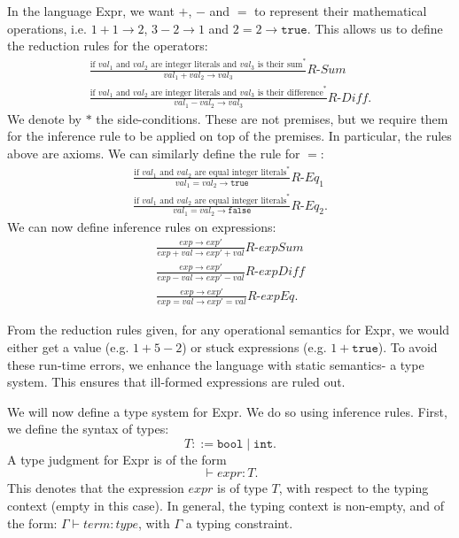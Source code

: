 \documentclass[a4paper, openany]{memoir}
\begin{document}
    In the language Expr, we want $+$, $-$ and $=$ to represent their mathematical operations, i.e. $1 + 1 \to 2$, $3 - 2 \to 1$ and $2 = 2 \to \texttt{true}$. This allows us to define the reduction rules for the operators:
    \begin{align*}
        \frac{\textrm{if } val_1 \textrm{ and } val_2 \textrm{ are integer literals and } val_3 \textrm{ is their sum}^*}{val_1 + val_2 \to val_3} \textit{R-Sum} \\
        \frac{\textrm{if } val_1 \textrm{ and } val_2 \textrm{ are integer literals and } val_3 \textrm{ is their difference}^*}{val_1 - val_2 \to val_3} \textit{R-Diff}.
    \end{align*}
    We denote by $*$ the side-conditions. These are not premises, but we require them for the inference rule to be applied on top of the premises. In particular, the rules above are axioms. We can similarly define the rule for $=$:
    \begin{align*}
        \frac{\textrm{if } val_1 \textrm{ and } val_2 \textrm{ are equal integer literals}^*}{val_1 = val_2 \to \texttt{true}} \textit{R-Eq}_1 \\
        \frac{\textrm{if } val_1 \textrm{ and } val_2 \textrm{ are equal integer literals}^*}{val_1 = val_2 \to \texttt{false}} \textit{R-Eq}_2.
    \end{align*}
    We can now define inference rules on expressions:
    \begin{align*}
        \frac{exp \to exp'}{exp + val \to exp' + val} \textit{R-expSum} \\
        \frac{exp \to exp'}{exp - val \to exp' - val} \textit{R-expDiff} \\
        \frac{exp \to exp'}{exp = val \to exp' = val} \textit{R-expEq}.
    \end{align*}

    From the reduction rules given, for any operational semantics for Expr, we would either get a value (e.g. $1 + 5 - 2$) or stuck expressions (e.g. $1 + \texttt{true}$). To avoid these run-time errors, we enhance the language with static semantics- a type system. This ensures that ill-formed expressions are ruled out.

    We will now define a type system for Expr. We do so using inference rules. First, we define the syntax of types:
    \[T ::= \texttt{bool} \mid \texttt{int}.\]
    A type judgment for Expr is of the form 
    \[\vdash expr \colon T.\]
    This denotes that the expression $expr$ is of type $T$, with respect to the typing context (empty in this case). In general, the typing context is non-empty, and of the form: $\Gamma \vdash term \colon type$, with $\Gamma$ a typing constraint.
\end{document}
